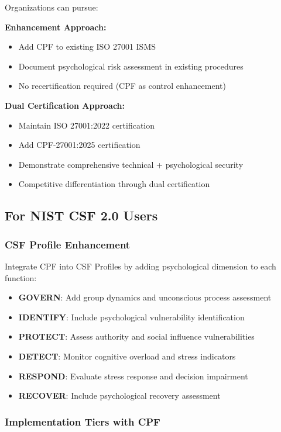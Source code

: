 \documentclass[11pt,a4paper]{article}
\begin{document}
Organizations can pursue:

\textbf{Enhancement Approach:}
\begin{itemize}
\item Add CPF to existing ISO 27001 ISMS
\item Document psychological risk assessment in existing procedures
\item No recertification required (CPF as control enhancement)
\end{itemize}

\textbf{Dual Certification Approach:}
\begin{itemize}
\item Maintain ISO 27001:2022 certification
\item Add CPF-27001:2025 certification
\item Demonstrate comprehensive technical + psychological security
\item Competitive differentiation through dual certification
\end{itemize}

\subsection{For NIST CSF 2.0 Users}

\subsubsection{CSF Profile Enhancement}

Integrate CPF into CSF Profiles by adding psychological dimension to each function:

\begin{itemize}
\item \textbf{GOVERN}: Add group dynamics and unconscious process assessment
\item \textbf{IDENTIFY}: Include psychological vulnerability identification
\item \textbf{PROTECT}: Assess authority and social influence vulnerabilities
\item \textbf{DETECT}: Monitor cognitive overload and stress indicators
\item \textbf{RESPOND}: Evaluate stress response and decision impairment
\item \textbf{RECOVER}: Include psychological recovery assessment
\end{itemize}

\subsubsection{Implementation Tiers with CPF}
\end{document}
